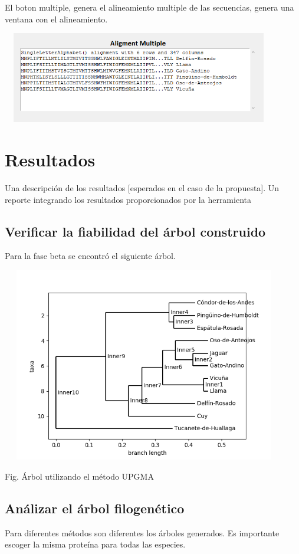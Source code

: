 \documentclass[a4paper]{article}
\begin{document}
El boton multiple, genera el alineamiento multiple de las secuencias, genera una ventana con el alineamiento.

\begin{center}
	\includegraphics[width=12cm,height=4cm]{multiple.png}
\end{center}


\section{Resultados}
Una descripción de los resultados [esperados en el caso de la propuesta]. Un reporte integrando los resultados proporcionados por la herramienta

\subsection{Verificar la fiabilidad del árbol construido}
Para la fase beta se encontró el siguiente árbol.

\begin{center}
	\includegraphics[width=12.5cm,height=8.5cm]{arbol.png}
	
	Fig. Árbol utilizando el método UPGMA
\end{center}

\subsection{Análizar el árbol filogenético}
Para diferentes métodos son diferentes los árboles generados. Es importante escoger la misma proteína para todas las especies.
\end{document}
